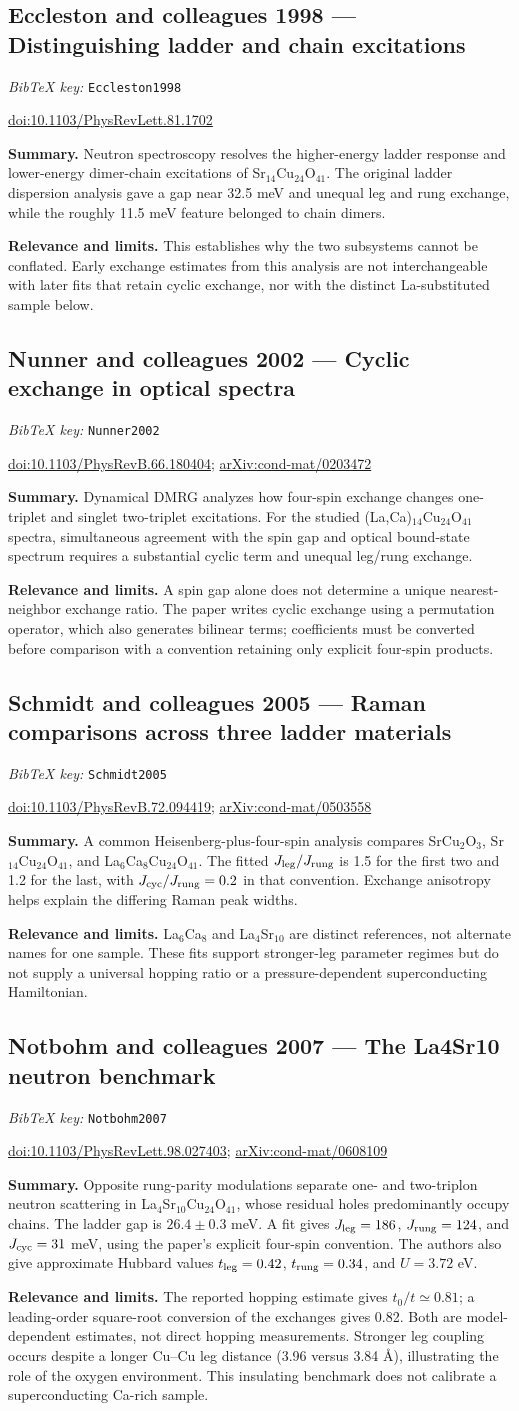 \documentclass[11pt]{article}
\newcommand{\paper}[2]{\Needspace{8\baselineskip}\subsection{#2}\label{paper:#1}\textit{BibTeX key:} \texttt{#1}\quad\citep{#1}\par}
\newcommand{\doi}[1]{\href{https://doi.org/#1}{doi:#1}}
\newcommand{\arxiv}[1]{\href{https://arxiv.org/abs/#1}{arXiv:#1}}
\newcommand{\summary}{\par\textbf{Summary.} }
\newcommand{\relevance}{\par\textbf{Relevance and limits.} }
\begin{document}
\paper{Eccleston1998}{Eccleston and colleagues 1998 --- Distinguishing ladder and chain excitations}
\doi{10.1103/PhysRevLett.81.1702}
\summary Neutron spectroscopy resolves the higher-energy ladder response and lower-energy dimer-chain excitations of Sr$_{14}$Cu$_{24}$O$_{41}$. The original ladder dispersion analysis gave a gap near 32.5 meV and unequal leg and rung exchange, while the roughly 11.5 meV feature belonged to chain dimers.
\relevance This establishes why the two subsystems cannot be conflated. Early exchange estimates from this analysis are not interchangeable with later fits that retain cyclic exchange, nor with the distinct La-substituted sample below.

\paper{Nunner2002}{Nunner and colleagues 2002 --- Cyclic exchange in optical spectra}
\doi{10.1103/PhysRevB.66.180404}; \arxiv{cond-mat/0203472}
\summary Dynamical DMRG analyzes how four-spin exchange changes one-triplet and singlet two-triplet excitations. For the studied (La,Ca)$_{14}$Cu$_{24}$O$_{41}$ spectra, simultaneous agreement with the spin gap and optical bound-state spectrum requires a substantial cyclic term and unequal leg/rung exchange.
\relevance A spin gap alone does not determine a unique nearest-neighbor exchange ratio. The paper writes cyclic exchange using a permutation operator, which also generates bilinear terms; coefficients must be converted before comparison with a convention retaining only explicit four-spin products.

\paper{Schmidt2005}{Schmidt and colleagues 2005 --- Raman comparisons across three ladder materials}
\doi{10.1103/PhysRevB.72.094419}; \arxiv{cond-mat/0503558}
\summary A common Heisenberg-plus-four-spin analysis compares SrCu$_2$O$_3$, Sr$_{14}$Cu$_{24}$O$_{41}$, and La$_6$Ca$_8$Cu$_{24}$O$_{41}$. The fitted $J_{\rm leg}/J_{\rm rung}$ is 1.5 for the first two and 1.2 for the last, with $J_{\rm cyc}/J_{\rm rung}=0.2$ in that convention. Exchange anisotropy helps explain the differing Raman peak widths.
\relevance La$_6$Ca$_8$ and La$_4$Sr$_{10}$ are distinct references, not alternate names for one sample. These fits support stronger-leg parameter regimes but do not supply a universal hopping ratio or a pressure-dependent superconducting Hamiltonian.

\paper{Notbohm2007}{Notbohm and colleagues 2007 --- The La4Sr10 neutron benchmark}
\doi{10.1103/PhysRevLett.98.027403}; \arxiv{cond-mat/0608109}
\summary Opposite rung-parity modulations separate one- and two-triplon neutron scattering in La$_4$Sr$_{10}$Cu$_{24}$O$_{41}$, whose residual holes predominantly occupy chains. The ladder gap is $26.4\pm0.3$ meV. A fit gives $J_{\rm leg}=186$, $J_{\rm rung}=124$, and $J_{\rm cyc}=31$ meV, using the paper's explicit four-spin convention. The authors also give approximate Hubbard values $t_{\rm leg}=0.42$, $t_{\rm rung}=0.34$, and $U=3.72$ eV.
\relevance The reported hopping estimate gives $t_0/t\simeq0.81$; a leading-order square-root conversion of the exchanges gives 0.82. Both are model-dependent estimates, not direct hopping measurements. Stronger leg coupling occurs despite a longer Cu--Cu leg distance (3.96 versus 3.84 \AA), illustrating the role of the oxygen environment. This insulating benchmark does not calibrate a superconducting Ca-rich sample.
\end{document}
